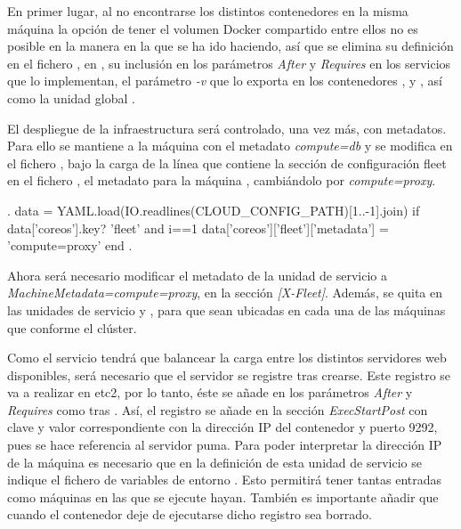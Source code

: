 En primer lugar, al no encontrarse los distintos contenedores en la misma máquina la opción de tener el volumen Docker  compartido entre ellos no es posible en la manera en la que se ha ido haciendo, así que se elimina su definición en el fichero , en , su inclusión en los parámetros \textit{After} y \textit{Requires} en los servicios que lo implementan, el parámetro \textit{-v} que lo exporta en los contenedores ,  y , así como la unidad global .

El despliegue de la infraestructura será controlado, una vez más, con metadatos. Para ello se mantiene a la máquina  con el metadato \textit{compute=db} y se modifica en el fichero , bajo la carga de la línea que contiene la sección de configuración fleet en el fichero , el metadato para la máquina , cambiándolo por \textit{compute=proxy}.

\begin{codelisting}
\label{code:vagrantfile2}
\begin{code}
.
data = YAML.load(IO.readlines(CLOUD_CONFIG_PATH)[1..-1].join)
if data['coreos'].key? 'fleet' and i==1
 data['coreos']['fleet']['metadata'] = 'compute=proxy'
end
.
\end{code}
\end{codelisting}

Ahora será necesario modificar el metadato de la unidad de servicio  a \textit{MachineMetadata=compute=proxy}, en la sección \textit{[X-Fleet]}. Además, se quita  en las unidades de servicio  y , para que sean ubicadas en cada una de las máquinas que conforme el clúster.

Como el servicio  tendrá que balancear la carga entre los distintos servidores web disponibles, será necesario que el servidor  se registre tras crearse. Este registro se va a realizar en etc2, por lo tanto, éste se añade en los parámetros \textit{After} y \textit{Requires} como  tras . Así, el registro se añade en la sección \textit{ExecStartPost} con clave  y valor correspondiente con la dirección IP del contenedor y puerto 9292, pues se hace referencia al servidor puma. Para poder interpretar la dirección IP de la máquina es necesario que en la definición de esta unidad de servicio se indique el fichero de variables de entorno . Esto permitirá tener tantas entradas  como máquinas en las que se ejecute hayan. También es importante añadir que cuando el contenedor deje de ejecutarse dicho registro sea borrado.

